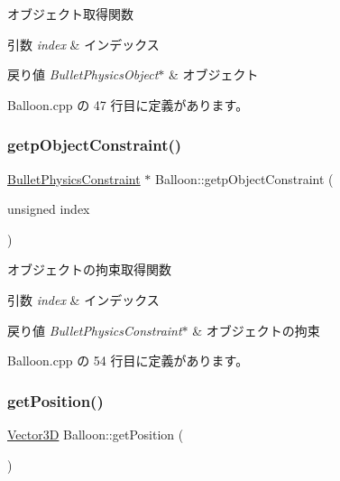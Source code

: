 オブジェクト取得関数 


\begin{DoxyParams}{引数}
{\em index} & インデックス \\
\hline
\end{DoxyParams}

\begin{DoxyRetVals}{戻り値}
{\em Bullet\+Physics\+Object$\ast$} & オブジェクト \\
\hline
\end{DoxyRetVals}


 Balloon.\+cpp の 47 行目に定義があります。

\mbox{\label{class_balloon_afe165a4c82a8d5797bd21762ffbb2c64}} 
\subsubsection{\texorpdfstring{getp\+Object\+Constraint()}{getpObjectConstraint()}}
{\footnotesize\ttfamily \mbox{\hyperlink{class_bullet_physics_constraint}{Bullet\+Physics\+Constraint}} $\ast$ Balloon\+::getp\+Object\+Constraint (\begin{DoxyParamCaption}\item[{unsigned}]{index }\end{DoxyParamCaption})}



オブジェクトの拘束取得関数 


\begin{DoxyParams}{引数}
{\em index} & インデックス \\
\hline
\end{DoxyParams}

\begin{DoxyRetVals}{戻り値}
{\em Bullet\+Physics\+Constraint$\ast$} & オブジェクトの拘束 \\
\hline
\end{DoxyRetVals}


 Balloon.\+cpp の 54 行目に定義があります。

\mbox{\label{class_balloon_a1e262c3e11e1bf76e86d5e7c57bb4438}} 
\subsubsection{\texorpdfstring{get\+Position()}{getPosition()}}
{\footnotesize\ttfamily \mbox{\hyperlink{class_vector3_d}{Vector3D}} Balloon\+::get\+Position (\begin{DoxyParamCaption}{ }\end{DoxyParamCaption})}




